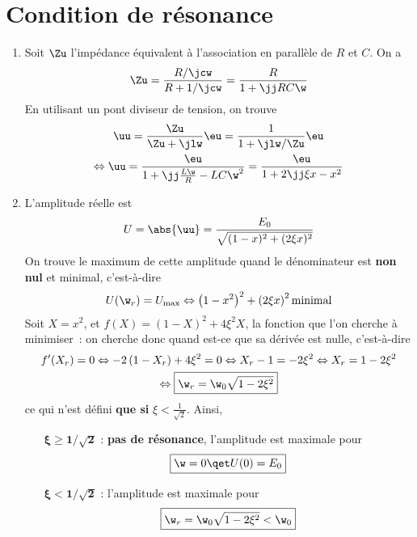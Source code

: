 \documentclass[a4paper, 12pt, final, garamond]{book}
\begin{document}
\section{Condition de résonance}
\begin{enumerate}
    \item Soit $\Zu$ l'impédance équivalent à l'association en parallèle de $R$
        et $C$. On a
        \begin{gather*}
            \Zu = \frac{R/\jcw}{R + 1/\jcw} = \frac{R}{1+\jj RC\w}
        \end{gather*}
        En utilisant un pont diviseur de tension, on trouve
        \begin{gather*}
            \uu = \frac{\Zu}{\Zu + \jlw}\eu
                = \frac{1}{1+\jlw/\Zu}\eu\\
            \Leftrightarrow
            \uu = \frac{\eu}{1+ \jj \frac{L\w}{R} - LC\w^2}
                = \frac{\eu}{1+ 2\jj\xi x - x^2}
        \end{gather*}
    \item L'amplitude réelle est
        \begin{gather*}
            U = \abs{\uu} = \frac{E_0}{\sqrt{(1-x)^2 + (2\xi x)^2}}
        \end{gather*}
    On trouve le maximum de cette amplitude quand le dénominateur est
    \textbf{non nul} et minimal, c'est-à-dire
    \begin{gather*}
        U(\w_r) = U_{\max}
        \Leftrightarrow
        \left( 1 - x^2 \right)^2 + \left(2\xi x\right)^2 \text{minimal}
    \end{gather*}
    Soit $X = x^2$, et $f(X) = \left(1 - X\right)^2 + 4\xi^2X$, la fonction que
    l'on cherche à minimiser~: on cherche donc quand est-ce que sa dérivée est
    nulle, c'est-à-dire
    \begin{gather*}
        f'(X_r) = 0
        \Leftrightarrow
        -2 \left( 1-X_r \right) + 4\xi^2 = 0
        \Leftrightarrow
        X_r-1 = - 2\xi^2
        \Leftrightarrow
        X_r = 1 - 2\xi^2\\
        \Leftrightarrow
        \boxed{
        \w_r = \w_0 \sqrt{1 - 2\xi^2}}
    \end{gather*}
    ce qui n'est défini \textbf{que si} $\xi < \frac{1}{\sqrt{2}}$. Ainsi,
    \begin{itemize}[leftmargin=60pt]
        \item[$\mathbf{\xi \geq 1/\sqrt{2}}$] : \textbf{pas de résonance},
            l'amplitude est maximale pour
            \[\boxed{\w = 0 \qet U(0) = E_0}\]
        \item[$\mathbf{\xi < 1/\sqrt{2}}$] : l'amplitude est maximale pour
            \[\boxed{\w_r = \w_0 \sqrt{1 - 2\xi^2} < \w_0}\]
    \end{itemize}
\end{enumerate}
\end{document}
